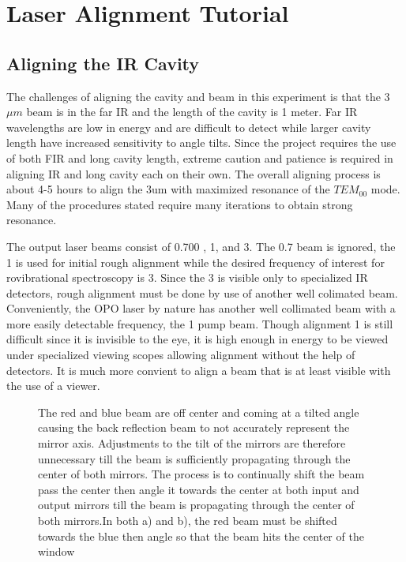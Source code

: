\documentclass[11pt,a4paper]{book}
\newcommand{\imginput}[1]{} %
\begin{document}
\chapter{Laser Alignment Tutorial}
	\section{Aligning the IR Cavity}
		\label{sec:Aligning the IR Cavity}
		The challenges of aligning the cavity and beam in this experiment is that the 3$\mu m$ beam is in the far IR and the length of the cavity is 1 meter. Far IR wavelengths are low in energy and are difficult to detect while larger cavity length have increased sensitivity to angle tilts. Since the project requires the use of both  FIR and long cavity length, extreme caution and patience is required in aligning IR and long cavity each on their own. The overall aligning process is about 4-5 hours to align the 3um with maximized resonance of the $TEM_{00}$ mode. Many of the procedures stated require many iterations to obtain strong resonance.
		
		The output laser beams consist of 0.700 , 1, and 3. The 0.7 beam is ignored, the 1 is used for initial rough alignment while the desired frequency of interest for rovibrational spectroscopy is 3. 
		Since the 3 is visible only to specialized IR detectors, rough alignment must be done by use of another well colimated beam. Conveniently, the OPO laser by nature has another well collimated beam with a more easily detectable frequency, the 1 pump beam. Though alignment 1 is still difficult since it is invisible to the eye, it is high enough in energy to be viewed under specialized viewing scopes allowing alignment without the help of detectors. It is much more convient to align a beam that is at least visible with the use of a viewer.
		
		\begin{figure} [!ht]
			\centering
			\def\svgwidth{\columnwidth}
			\resizebox{130mm}{!}{\imginput{images/cav-align-improper.pdf_tex}}
			\caption{The red and blue beam are off center and coming at a tilted angle causing the back reflection beam to not accurately represent the mirror axis. Adjustments to the tilt of the mirrors are therefore unnecessary till the beam is sufficiently propagating through the center of both mirrors. 
				The process is to continually shift the beam pass the center then angle it towards the center at both input and output mirrors till the beam is propagating through the center of both mirrors.In both a) and b), the red beam must be shifted towards the blue then angle so that the beam hits the center of the window}
			\label{fig:cav-align-improper}
		\end{figure}
		
\end{document}
